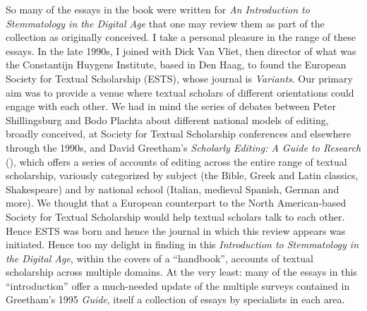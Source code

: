 \begin{review}
So many of the essays in the book were written for \emph{An
Introduction to Stemmatology in the Digital Age} that one may review
them as part of the collection as originally conceived. I take a
personal pleasure in the range of these essays. In the late 1990s, I
joined with Dick Van Vliet, then director of what was the Constantijn
Huygens Institute, based in Den Haag, to found the European Society for
Textual Scholarship (ESTS), whose journal is \emph{Variants}. Our
primary aim was to provide a venue where textual scholars of different
orientations could engage with each other. We had in mind the series of
debates between Peter Shillingsburg and Bodo Plachta about different
national models of editing, broadly conceived, at Society for Textual
Scholarship conferences and elsewhere through the 1990s, and David
Greetham's \emph{Scholarly Editing: A Guide to Research} (\citeyear{greetham_scholarly_1995}), which
offers a series of accounts of editing across the entire range of
textual scholarship, variously categorized by subject (the Bible, Greek
and Latin classics, Shakespeare) and by national school (Italian,
medieval Spanish, German and more). We thought that a European
counterpart to the North American-based Society for Textual Scholarship
would help textual scholars talk to each other. Hence ESTS was born and
hence the journal in which this review appears was initiated. Hence too
my delight in finding in this \emph{Introduction to Stemmatology in the
Digital Age}, within the covers of a ``handbook'', accounts of textual
scholarship across multiple domains. At the very least: many of the
essays in this ``introduction'' offer a much-needed update of the
multiple surveys contained in Greetham's 1995 \emph{Guide}, itself a
collection of essays by specialists in each area.


\end{review}
